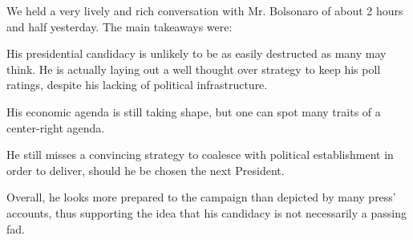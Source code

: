 \documentclass[11pt]{article}
\date{}
\title{}
\begin{document}
\begin{compactitem}
\item We held a very lively and rich conversation with Mr. Bolsonaro of
about 2 hours and half yesterday. The main takeaways were:
\begin{compactitem}
\item His presidential candidacy is unlikely to be as easily destructed
as many may think. He is actually laying out a well thought over
strategy to keep his poll ratings, despite his lacking of
political infrastructure.
\item His economic agenda is still taking shape, but one can spot
many traits of a center-right agenda.
\item He still misses a convincing strategy to coalesce with political
establishment in order to deliver, should he be chosen the next
President.
\end{compactitem}
\item Overall, he looks more prepared to the campaign than depicted by
many press' accounts, thus supporting the idea that his candidacy is not
necessarily a passing fad.
\end{compactitem}
\end{document}
